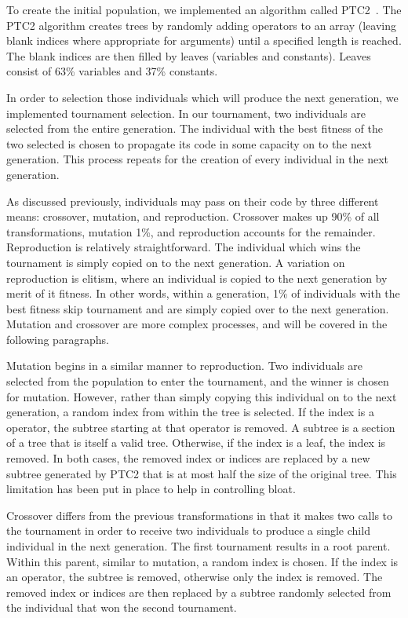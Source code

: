 \documentclass[12pt]{article}
\begin{document}
To create the initial population, we implemented an algorithm called PTC2~\cite{Luke2013Metaheuristics}. The PTC2 algorithm creates trees by randomly adding operators to an array (leaving blank indices where appropriate for arguments) until a specified length is reached. The blank indices are then filled by leaves (variables and constants). Leaves consist of 63\% variables and 37\% constants.

In order to selection those individuals which will produce the next generation, we  implemented tournament selection. In our tournament, two individuals are selected from the entire generation. The individual with the best fitness of the two selected is chosen to propagate its code in some capacity on to the next generation. This process repeats for the creation of every individual in the next generation.

As discussed previously, individuals may pass on their code by three different means: crossover, mutation, and reproduction. Crossover makes up 90\% of all transformations, mutation 1\%, and reproduction accounts for the remainder. Reproduction is relatively straightforward. The individual which wins the tournament is simply copied on to the next generation. A variation on reproduction is elitism, where an individual is copied to the next generation by merit of it fitness. In other words, within a generation, 1\% of individuals with the best fitness skip tournament and are simply copied over to the next generation. Mutation and crossover are more complex processes, and will be covered in the following paragraphs.

Mutation begins in a similar manner to reproduction. Two individuals are selected from the population to enter the tournament, and the winner is chosen for mutation. However, rather than simply copying this individual on to the next generation, a random index from within the tree is selected. If the index is a operator, the subtree starting at that operator is removed. A subtree is a section of a tree that is itself a valid tree. Otherwise, if the index is a leaf, the index is removed. In both cases, the removed index or indices are replaced by a new subtree generated by PTC2 that is at most half the size of the original tree. This limitation has been put in place to help in controlling bloat.

Crossover differs from the previous transformations in that it makes two calls to the tournament in order to receive two individuals to produce a single child individual in the next generation. The first tournament results in a root parent. Within this parent, similar to mutation, a random index is chosen. If the index is an operator, the subtree is removed, otherwise only the index is removed. The removed index or indices are then replaced by a subtree randomly selected from the individual that won the second tournament.
\end{document}
